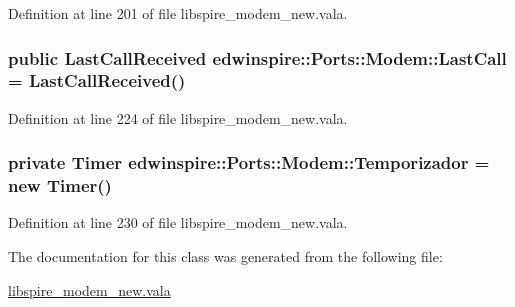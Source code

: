 Definition at line 201 of file libspire\-\_\-modem\-\_\-new.\-vala.

\hypertarget{classedwinspire_1_1Ports_1_1Modem_a9cb9107204054dca45a6a75ba3bb66d8}{
\subsubsection[{Last\-Call}]{\setlength{\rightskip}{0pt plus 5cm}public {\bf Last\-Call\-Received} edwinspire\-::\-Ports\-::\-Modem\-::\-Last\-Call = {\bf Last\-Call\-Received}()\hspace{0.3cm}{\ttfamily [private]}}}\label{classedwinspire_1_1Ports_1_1Modem_a9cb9107204054dca45a6a75ba3bb66d8}


Definition at line 224 of file libspire\-\_\-modem\-\_\-new.\-vala.

\hypertarget{classedwinspire_1_1Ports_1_1Modem_a899c47d75446730990d26292f1fc15fe}{
\subsubsection[{Temporizador}]{\setlength{\rightskip}{0pt plus 5cm}private Timer edwinspire\-::\-Ports\-::\-Modem\-::\-Temporizador = new Timer()\hspace{0.3cm}{\ttfamily [private]}}}\label{classedwinspire_1_1Ports_1_1Modem_a899c47d75446730990d26292f1fc15fe}


Definition at line 230 of file libspire\-\_\-modem\-\_\-new.\-vala.



The documentation for this class was generated from the following file\-:\begin{DoxyCompactItemize}
\item 
\hyperlink{libspire__modem__new_8vala}{libspire\-\_\-modem\-\_\-new.\-vala}\end{DoxyCompactItemize}
